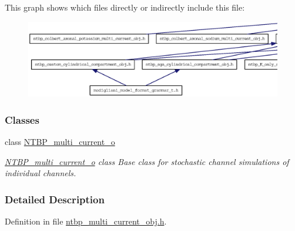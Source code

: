 This graph shows which files directly or indirectly include this file:
\nopagebreak
\begin{figure}[H]
\begin{center}
\leavevmode
\includegraphics[width=400pt]{ntbp__multi__current__obj_8h__dep__incl}
\end{center}
\end{figure}
\subsubsection*{Classes}
\begin{DoxyCompactItemize}
\item 
class \hyperlink{class_n_t_b_p__multi__current__o}{NTBP\_\-multi\_\-current\_\-o}
\begin{DoxyCompactList}\small\item\em \hyperlink{class_n_t_b_p__multi__current__o}{NTBP\_\-multi\_\-current\_\-o} class Base class for stochastic channel simulations of individual channels. \item\end{DoxyCompactList}\end{DoxyCompactItemize}


\subsubsection{Detailed Description}


Definition in file \hyperlink{ntbp__multi__current__obj_8h_source}{ntbp\_\-multi\_\-current\_\-obj.h}.

